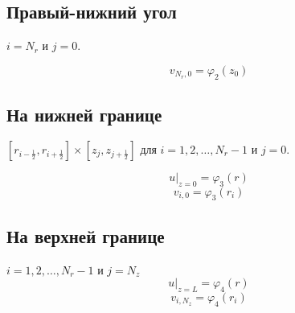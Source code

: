 \subsection{Правый-нижний угол}

$ i = N_r $ и $ j = 0 $.

\[ v_{N_r,0} = \varphi_2(z_0) \]

\subsection{На нижней границе}
$ [r_{i  -\frac{1}{2}}, r_{i +\frac{1}{2}}] \times  [z_{j}, z_{j +\frac{1}{2}}] $
для $ i = 1, 2, \dots, N_r - 1 $ и $ j = 0$.

\[ \left . u \right \vert_{z=0} = \varphi_3(r) \]
\[ v_{i,0} = \varphi_3(r_i) \]

\subsection{На верхней границе}
$ i = 1, 2, \dots, N_r - 1 $ и $ j = N_z $
\[ \left . u \right \vert_{z=L} = \varphi_4(r) \]
\[ v_{i,N_z} = \varphi_4(r_i) \]
